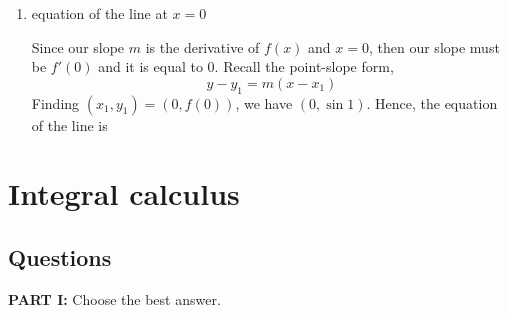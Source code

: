 \documentclass[10pt,paper=letter]{scrartcl}
\begin{document}
\begin{enumerate}[resume, label=\arabic*.,font=\bfseries]
\begin{enumerate}
    
    \item[(b)] equation of the line at $x=0$
    
    
    \sol Since our slope $m$ is the derivative of $f(x)$ and $x=0$, then our slope must be $f'(0)$ and it is equal to 0. Recall the point-slope form, $$y-y_1 = m(x-x_1)$$ Finding $(x_1, y_1) = (0, f(0))$, we have $(0,\sin 1)$. Hence, the equation of the line is 
\end{enumerate}

\end{enumerate}

\newpage

\section{Integral calculus}

\subsection{Questions}

\textbf{PART I:} Choose the best answer.
\end{document}
